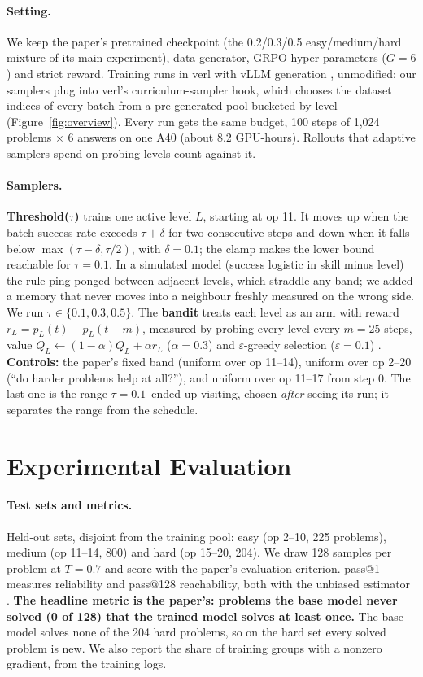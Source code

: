 \documentclass[11pt]{article}
\newcommand{\tauone}{$\tau{=}0.1$}
\begin{document}
\paragraph{Setting.} We keep the paper's pretrained checkpoint (the 0.2/0.3/0.5 easy/medium/hard mixture of
its main experiment), data generator, GRPO hyper-parameters ($G=6$) and strict reward. Training runs in verl
\citep{sheng2025hybridflow} with vLLM generation \citep{kwon2023vllm}, unmodified: our samplers plug into
verl's curriculum-sampler hook, which chooses the dataset indices of every batch from a pre-generated pool
bucketed by level (Figure~\ref{fig:overview}). Every run gets the same budget, 100 steps of 1,024 problems
$\times$ 6 answers on one A40 (about 8.2 GPU-hours). Rollouts that adaptive samplers spend on probing
levels count against it.

\paragraph{Samplers.} \textbf{Threshold($\tau$)} trains one active level $L$, starting at op 11. It moves up
when the batch success rate exceeds $\tau+\delta$ for two consecutive steps and down when it falls below
$\max(\tau-\delta, \tau/2)$, with $\delta=0.1$; the clamp makes the lower bound reachable for $\tau=0.1$. In
a simulated model (success logistic in skill minus level) the rule ping-ponged between adjacent levels, which
straddle any band; we added a memory that never moves into a neighbour freshly measured on the wrong side.
We run $\tau\in\{0.1, 0.3, 0.5\}$. The \textbf{bandit} treats each level as an arm with reward
$r_L=p_L(t)-p_L(t-m)$, measured by probing every level every $m=25$ steps, value
$Q_L\leftarrow(1-\alpha)Q_L+\alpha r_L$ ($\alpha=0.3$) and $\varepsilon$-greedy selection ($\varepsilon=0.1$)
\citep{sutton2018rl}. \textbf{Controls:} the paper's fixed band (uniform over op 11--14), uniform over op
2--20 (``do harder problems help at all?''), and uniform over op 11--17 from step 0. The last one is the
range \tauone\ ended up visiting, chosen \emph{after} seeing its run; it separates the range from the
schedule.

\section{Experimental Evaluation}
\label{sec:eval}

\paragraph{Test sets and metrics.} Held-out sets, disjoint from the training pool: easy (op 2--10, 225
problems), medium (op 11--14, 800) and hard (op 15--20, 204). We draw 128 samples per problem at $T=0.7$ and
score with the paper's evaluation criterion. pass@1 measures reliability and pass@128 reachability, both
with the unbiased estimator \citep{chen2021codex}. \textbf{The headline metric is the paper's: problems the
base model never solved (0 of 128) that the trained model solves at least once.} The base model solves none
of the 204 hard problems, so on the hard set every solved problem is new. We also report the share of
training groups with a nonzero gradient, from the training logs.
\end{document}
